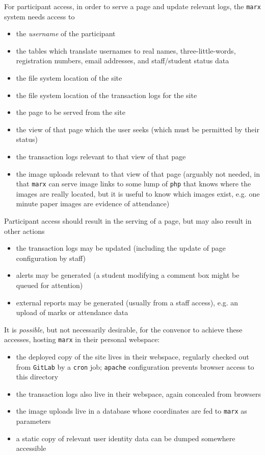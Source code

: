 \documentclass{article}
\begin{document}
For participant access, in order to serve a page and update relevant logs, the {\tt marx} system needs access to
\begin{itemize}
\item the \emph{username} of the participant
\item the tables which translate usernames to real names, three-little-words, registration numbers, email addresses, and staff/student status data
\item the file system location of the site
\item the file system location of the transaction logs for the site
\item the page to be served from the site
\item the view of that page which the user seeks (which must be permitted by their status)
\item the transaction logs relevant to that view of that page
\item the image uploads relevant to that view of that page (arguably not needed, in that {\tt marx} can serve image links to some lump of {\tt php} that knows where the images are really located, but it is useful to know which images exist, e.g. one minute paper images are evidence of attendance)
\end{itemize}

Participant access should result in the serving of a page, but may also result in other actions
\begin{itemize}
\item the transaction logs may be updated (including the update of page configuration by staff)
\item alerts may be generated (a student modifying a comment box might be queued for attention)
\item external reports may be generated (usually from a staff access), e.g. an upload of marks or
  attendance data
\end{itemize}

It is \emph{possible}, but not necessarily desirable, for the convenor to achieve these accesses,
hosting {\tt marx} in their personal webspace:
\begin{itemize}
\item the deployed copy of the site lives in their webspace, regularly checked out from {\tt GitLab}
  by a {\tt cron} job; {\tt apache} configuration prevents browser access to this directory
\item the transaction logs also live in their webspace, again concealed from browsers
\item the image uploads live in a database whose coordinates are fed to {\tt marx} as parameters
\item a static copy of relevant user identity data can be dumped somewhere accessible
\end{itemize}
\end{document}
